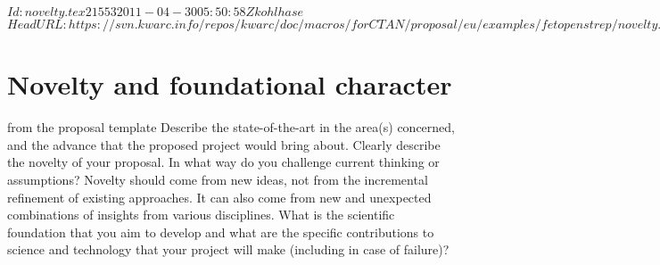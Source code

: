 \svnInfo $Id: novelty.tex 21553 2011-04-30 05:50:58Z kohlhase $
\svnKeyword $HeadURL: https://svn.kwarc.info/repos/kwarc/doc/macros/forCTAN/proposal/eu/examples/fetopenstrep/novelty.tex $
\section{Novelty and foundational character}\label{sec:progress}
\begin{todo}{from the proposal template}
  Describe the state-of-the-art in the area(s) concerned, and the advance that the
  proposed project would bring about. Clearly describe the novelty of your proposal. In
  what way do you challenge current thinking or assumptions? Novelty should come from new
  ideas, not from the incremental refinement of existing approaches. It can also come from
  new and unexpected combinations of insights from various disciplines. What is the
  scientific foundation that you aim to develop and what are the specific contributions to
  science and technology that your project will make (including in case of failure)?
\end{todo}

